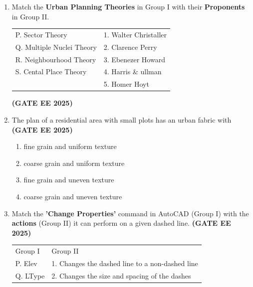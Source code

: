 \documentclass[journal,12pt,onecolumn]{IEEEtran}
\theoremstyle{remark}
\begin{document}
\begin{enumerate}
\begin{enumerate}
\begin{multicols}{2}
\end{multicols}
\end{enumerate}
\item  Match the \textbf{Urban Planning Theories} in Group I with their \textbf{Proponents} in Group II.
\newline
\begin{tabular}{p{}p{}}
  P. Sector Theory   & 1. Walter Christaller \\
Q. Multiple Nuclei Theory     & 2. Clarence Perry\\
R. Neighbourhood Theory &  3. Ebenezer Howard\\
S. Cental Place Theory & 4. Harris \& ullman\\
 & 5. Homer Hoyt\\
\end{tabular} \hfill \textbf{(GATE EE 2025)}
\begin{enumerate}
\end{enumerate}
\item The plan of a residential area with small plots has an urban fabric with \hfill \textbf{(GATE EE 2025)}
\begin{enumerate}
    \item fine grain and uniform texture
    \item coarse grain and uniform texture
    \item fine grain and uneven texture
    \item coarse grain and uneven texture
\end{enumerate}
\item  Match the \textbf{'Change Properties'} command in AutoCAD (Group I) with the \textbf{actions} (Group II) it can perform on a given dashed line. \hfill \textbf{(GATE EE 2025)}
\newline
\begin{tabular}{p{}p{}}
Group I     & Group II \\
 P. Elev    & 1. Changes the dashed line to a non-dashed line\\
 Q. LType & 2. Changes the size and spacing of the dashes\\

\end{tabular}
\end{enumerate}
\end{document}
